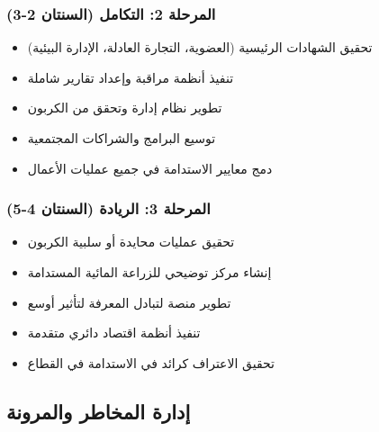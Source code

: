 \subsubsection{المرحلة 2: التكامل (السنتان 2-3)}
\begin{itemize}
    \item تحقيق الشهادات الرئيسية (العضوية، التجارة العادلة، الإدارة البيئية)
    \item تنفيذ أنظمة مراقبة وإعداد تقارير شاملة
    \item تطوير نظام إدارة وتحقق من الكربون
    \item توسيع البرامج والشراكات المجتمعية
    \item دمج معايير الاستدامة في جميع عمليات الأعمال
\end{itemize}

\subsubsection{المرحلة 3: الريادة (السنتان 4-5)}
\begin{itemize}
    \item تحقيق عمليات محايدة أو سلبية الكربون
    \item إنشاء مركز توضيحي للزراعة المائية المستدامة
    \item تطوير منصة لتبادل المعرفة لتأثير أوسع
    \item تنفيذ أنظمة اقتصاد دائري متقدمة
    \item تحقيق الاعتراف كرائد في الاستدامة في القطاع
\end{itemize}

\subsection{إدارة المخاطر والمرونة}

